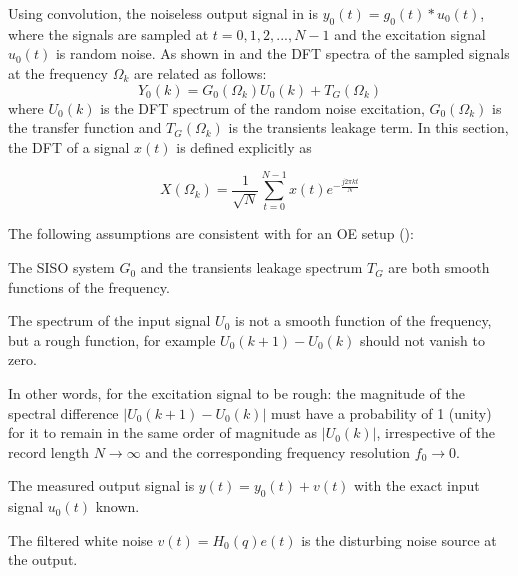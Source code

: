 Using convolution, the noiseless output signal in  is $y_0(t) = g_0(t)*u_0(t)$, where the signals are sampled at $t = 0, 1, 2,...,N-1$ and the excitation signal $u_0(t)$ is random noise. As shown in \citep{Pintelon2012} and \citep{Pintelon1997} the \gls{DFT} spectra of the sampled signals at the frequency $\Omega_k$ are related as follows:
\begin{equation}\label{lpmleak}
Y_0(k)=G_0(\Omega_k)U_0(k)+T_G(\Omega_k)
\end{equation}
where $U_0(k)$ is the \gls{DFT} spectrum of the random noise excitation,  $G_0(\Omega_k)$ is the transfer function and $T_G(\Omega_k)$ is the transients leakage term.
In this section, the \gls{DFT} of a signal $x(t)$ is defined explicitly as  \citep{Oppenheim1983}

\begin{equation}\label{eq:defDFT}
X(\Omega_k) = \frac{1}{\sqrt{N}}\sum_{t=0}^{N-1}x(t)e^{-\frac{j2\pi kt}{N}}
\end{equation}


The following assumptions are consistent with \citep{Schoukens2009LPM} for an OE setup ():
\begin{assumption}
The \gls{SISO} system $G_0$ and  the transients leakage spectrum $T_G$ are both smooth functions of the frequency.
\end{assumption}



\begin{assumption}

The spectrum of the  input signal $U_0$ is not a smooth function of the frequency, but a rough function, for example $U_0(k+1) - U_0(k)$ should not vanish to zero. %
\end{assumption}

In other words, for the excitation signal to be rough: the magnitude of the spectral difference $|U_0(k+1) - U_0(k)|$ must have a probability of 1 (unity) for it to remain in the same order of magnitude as $|U_0(k)|$, irrespective of the record length $N\rightarrow\infty$ and the corresponding  frequency resolution $f_0\rightarrow{0}$.


\begin{assumption}
The measured output signal is $y(t) = y_0(t) + v(t)$ with the exact input signal $u_0(t)$ known.
\end{assumption}


\begin{assumption}
The filtered white noise $v(t) = H_0(q)e(t)$ is the disturbing noise source at the output.
\end{assumption}


